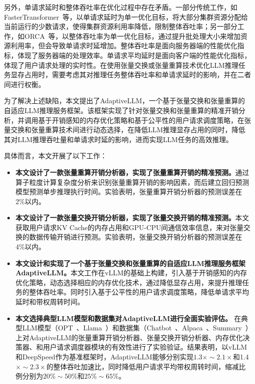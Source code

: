 另外，单请求延时和整体吞吐率在优化过程中存在矛盾。一部分传统工作，如FasterTransformer~\cite{FasterTransformer}等，以单请求延时为单一优化目标，将大部分集群资源分配给当前运行的少数请求，使得集群资源利用率降低，限制整体吞吐率；另一部分工作，如ORCA~\cite{vLLM, ORCA}等，以整体吞吐率为单一优化目标，通过提升批处理大小来增加资源利用率，但会导致单请求时延增加。整体吞吐率是面向服务器端的性能优化指标，体现了服务器端的处理效率。单请求平均延时是面向客户端的性能优化指标，体现了用户请求处理的实时性。在使用张量交换或张量重算技术优化LLM推理任务显存占用时，需要考虑其对推理任务整体吞吐率和单请求延时的影响，并在二者间进行权衡。

为了解决上述缺陷，本文提出了AdaptiveLLM，一个基于张量交换和张量重算的自适应LLM推理服务框架。该框架实现了针对张量交换和张量重算的精准开销分析，并调用基于开销感知的内存优化策略和基于公平性的用户请求调度策略，在张量交换和张量重算技术间进行动态选择，在降低LLM推理显存占用的同时，降低其对LLM推理吞吐量和单请求时延的影响，进而实现LLM任务的高效推理。

具体而言，本文开展了以下工作：

\begin{itemize}

    \item \textbf{本文设计了一款张量重算开销分析器，实现了张量重算开销的精准预测。}通过算子粒度计算复杂度分析来识别张量重算开销的影响因素，而后建立回归预测模型预测单步推理执行时间。实验表明，张量重算开销分析器的预测误差在2\%以内。
    
    \item \textbf{本文设计了一款张量交换开销分析器，实现了张量交换开销的精准预测。}本文获取用户请求KV Cache的内存占用和GPU-CPU间通信效率信息，来对张量交换的数据传输开销进行预测。实验表明，张量交换开销分析器的预测误差在4\%以内。

    \item \textbf{本文设计和实现了一个基于张量交换和张量重算的自适应LLM推理服务框架AdaptiveLLM。}本文工作在vLLM的基础上构建，引入基于开销感知的内存优化策略，动态选择相应的内存优化技术，通过降低显存占用，来提升推理任务的整体吞吐率。同时引入基于公平性的用户请求调度策略，降低单请求平均延时和带权周转时间。
    
    \item \textbf{本文选择典型LLM模型和数据集对AdaptiveLLM进行全面实验评估。} 在典型LLM模型（OPT~\cite{OPT}、Llama~\cite{Llama}）和数据集（Chatbot~\cite{Chatbot}、Alpaca~\cite{Alpaca}、Summary~\cite{Summary}）上对AdaptiveLLM的张量重算开销分析器、张量交换开销分析器、内存优化决策器、和用户请求调度器模块的有效性进行了实验验证。结果表明，以vLLM和DeepSpeed作为基准框架时，AdaptiveLLM能够分别实现$1.3\times\sim2.1\times$和1.4$\times\sim2.3\times$的整体吞吐加速比，同时降低用户请求平均带权周转时间，缩减比例分别为$20\%\sim50\%$和$25\%\sim65\%$。

\end{itemize}